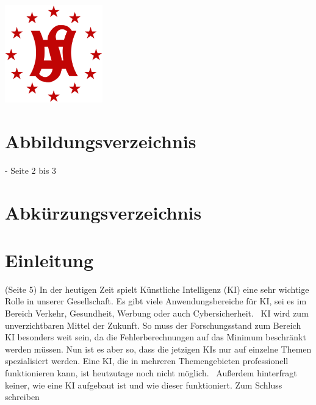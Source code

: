 \documentclass[11pt]{article}
\begin{document}
\begin{titlepage}
    
    \includegraphics[width=120pt, keepaspectratio]{images/sghm}\\[2cm]
     
    
    \vfill
    
    \end{titlepage}


\renewcommand{\contentsname}{Inhaltsverzeichnis}
\renewcommand{\figurename}{Abbildung}
\tableofcontents
\newpage
{}


\section{Abbildungsverzeichnis}
- Seite 2 bis 3

\newpage


\section{Abkürzungsverzeichnis}

\begin{acronym}
\end{acronym}
\newpage

\renewcommand\linenumberfont{\normalfont\small}
\setlength\linenumbersep{1cm}
\linenumbers{}

\section{Einleitung}
(Seite 5)
In der heutigen Zeit spielt Künstliche Intelligenz (KI) eine sehr wichtige Rolle in unserer
Gesellschaft.\label{1} Es gibt viele Anwendungsbereiche für KI, 
sei es im Bereich Verkehr, Gesundheit, Werbung oder auch Cybersicherheit.~\cite{useofki}
KI wird zum unverzichtbaren Mittel der Zukunft. So muss der
Forschungsstand zum Bereich KI besonders weit sein, da die Fehlerberechnungen auf das
Minimum beschränkt werden müssen.\label{2} Nun ist es aber so, dass die jetzigen KIs nur auf einzelne
Themen spezialisiert werden. Eine KI, die in mehreren Themengebieten
professionell funktionieren kann, ist heutzutage noch nicht möglich.~\cite{weakki}
Außerdem hinterfragt keiner, wie eine KI aufgebaut ist und wie dieser funktioniert.
Zum Schluss schreiben
\end{document}
